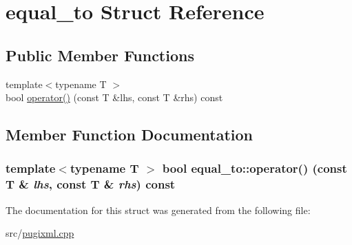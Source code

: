 \hypertarget{structequal__to}{
\section{equal\_\-to Struct Reference}
\label{structequal__to}
}
\subsection*{Public Member Functions}
\begin{DoxyCompactItemize}
\item 
{\footnotesize template$<$typename T $>$ }\\bool \hyperlink{structequal__to_a7ac5ec43d004eea5e077a01265a1641f}{operator()} (const T \&lhs, const T \&rhs) const 
\end{DoxyCompactItemize}


\subsection{Member Function Documentation}
\hypertarget{structequal__to_a7ac5ec43d004eea5e077a01265a1641f}{
\subsubsection[{operator()}]{\setlength{\rightskip}{0pt plus 5cm}template$<$typename T $>$ bool equal\_\-to::operator() (const T \& {\em lhs}, \/  const T \& {\em rhs}) const}}
\label{structequal__to_a7ac5ec43d004eea5e077a01265a1641f}


The documentation for this struct was generated from the following file:\begin{DoxyCompactItemize}
\item 
src/\hyperlink{pugixml_8cpp}{pugixml.cpp}\end{DoxyCompactItemize}
